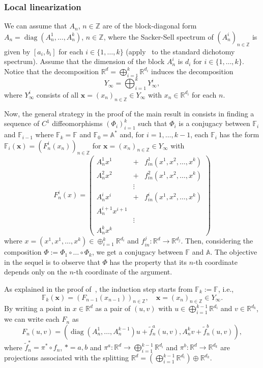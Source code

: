 \documentclass[reqno, a4paper, 10pt]{amsart}
\theoremstyle{plain}
\numberwithin{equation}{section}
\theoremstyle{remark}
\DeclareMathOperator{\diag}{diag}
\def\R{\mathbb{R}}
\def\Z{\mathbb{Z}}
\begin{document}
\subsubsection{Local linearization}
We can assume that $A_n$, $n\in \mathbb Z$ are of the block-diagonal form $A_n=\diag (A_n^1, \ldots, A_n^k)$, $n\in \mathbb  Z$, where the Sacker-Sell spectrum of $(A_n^i)_{n\in \mathbb Z}$ is given by $[a_i, b_i]$ for each $i\in \{1, \ldots, k\}$ (apply~\cite[Theorem 3.11]{CZSX} to the standard dichotomy spectrum).  Assume that the dimension of the block $A_n^i$ is $d_i$ for $i\in \{1, \ldots, k\}$. Notice that the decomposition $\mathbb R^d=\bigoplus_{i=1}^k \mathbb R^{d_i}$ induces the decomposition
\[
Y_\infty=\bigoplus_{i=1}^k Y_\infty^i,
\]
where $Y_\infty^i$ consists of all $\mathbf x=(x_n)_{n\in \mathbb Z}\in Y_\infty$ with $x_n\in \mathbb R^{d_i}$ for each $n$.


Now, the general strategy in the proof of the main result in \cite{ZZJ} consists in finding a sequence of $C^1$ diffeomorphisms $(\Phi_i)_{i=1}^k$ such that $\Phi_i$ is a conjugacy between $\mathbb F_i$ and $\mathbb F_{i-1}$ where $\mathbb F_k= \mathbb F$ and $\mathbb F_0=\mathbb A^\ast$ and, for $i=1,\ldots,k-1 $, each $\mathbb F_i$ has the form $\mathbb F_i(\mathbf x)=(F_n^i(x_n))_{n\in \Z}$ for $\mathbf x=(x_n)_{n\in \Z}\in Y_\infty$ with 
\[F_n^i(x)=\begin{pmatrix}
    A^1_nx^1&+&f^1_{in}(x^1,x^2,\ldots,x^k)\\
    A^2_nx^2&+&f^2_{in}(x^1,x^2,\ldots,x^k)\\
    &\vdots & \\
    A^i_nx^i&+&f^i_{in}(x^1,x^2,\ldots,x^k)\\
    A^{i+1}_nx^{i+1}&&\\
    &\vdots&\\
    A^k_nx^k&&     
\end{pmatrix}\]
where $x=(x^1,x^1,\ldots,x^k)\in \oplus_{i=1}^k \mathbb R^{d_i}$ and $f^j_{in}\colon \R^d\to \R^{d_j}$. Then, considering the composition $\Phi:=\Phi_1\circ\ldots\circ\Phi_k$, we get a conjugacy between $\mathbb F$ and $\mathbb A$. The objective in the sequel is to observe that $\Phi$ has the property that its $n$-th coordinate depends only on the $n$-th coordinate of the argument. 



As explained in the proof of~\cite[Lemma 10]{ZZJ}, the induction step starts from $\mathbb F_k:=\mathbb F$, i.e.,
\[
\mathbb F_k(\mathbf x)=(F_{n-1}(x_{n-1}))_{n\in \mathbb Z}, \quad \mathbf x=(x_n)_{n\in \mathbb Z}\in Y_\infty.
\]
By writing a point in $x\in \mathbb R^d$ as a pair of $(u, v)$ with $u\in \bigoplus_{i=1}^{k-1}\mathbb R^{d_i}$ and $v\in \mathbb R^{d_k}$, we can write each $F_n$ as 
\[
F_n(u, v)=(\diag (A_n^1, \ldots, A_n^{k-1})u+\tilde{f}_n^a(u, v), A_n^k v+\tilde{f}_n^b(u, v)),
\]
where $\tilde{f}_n^*=\pi^* \circ f_n$, $*=a, b$ and $\pi^a\colon \mathbb R^d\to \bigoplus_{i=1}^{k-1}\mathbb R^{d_i}$ and $\pi^b\colon \mathbb R^d \to \mathbb R^{d_k}$ are projections associated with the splitting $\mathbb R^d=(\bigoplus_{i=1}^{k-1}\mathbb R^{d_i})\oplus \mathbb R^{d_k}$. 
\end{document}
